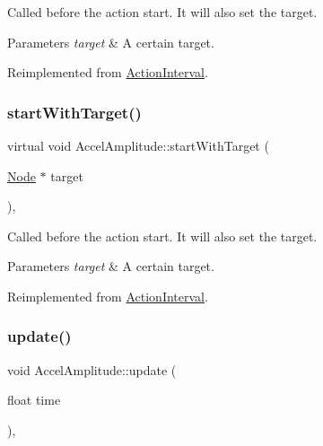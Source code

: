 Called before the action start. It will also set the target.


\begin{DoxyParams}{Parameters}
{\em target} & A certain target. \\
\hline
\end{DoxyParams}


Reimplemented from \hyperlink{classActionInterval_ad3d91186b2c3108488ddbbdbbd982484}{Action\+Interval}.

\mbox{\label{classAccelAmplitude_a8df55251b38588706be3d31c72db8737}} 
\subsubsection{\texorpdfstring{start\+With\+Target()}{startWithTarget()}\hspace{0.1cm}{\footnotesize\ttfamily [2/2]}}
{\footnotesize\ttfamily virtual void Accel\+Amplitude\+::start\+With\+Target (\begin{DoxyParamCaption}\item[{\hyperlink{classNode}{Node} $\ast$}]{target }\end{DoxyParamCaption})\hspace{0.3cm}{\ttfamily [override]}, {\ttfamily [virtual]}}

Called before the action start. It will also set the target.


\begin{DoxyParams}{Parameters}
{\em target} & A certain target. \\
\hline
\end{DoxyParams}


Reimplemented from \hyperlink{classActionInterval_ad3d91186b2c3108488ddbbdbbd982484}{Action\+Interval}.

\mbox{\label{classAccelAmplitude_adfd14b34a7bf24c50f9090aa187bb603}} 
\subsubsection{\texorpdfstring{update()}{update()}\hspace{0.1cm}{\footnotesize\ttfamily [1/2]}}
{\footnotesize\ttfamily void Accel\+Amplitude\+::update (\begin{DoxyParamCaption}\item[{float}]{time }\end{DoxyParamCaption})\hspace{0.3cm}{\ttfamily [override]}, {\ttfamily [virtual]}}

